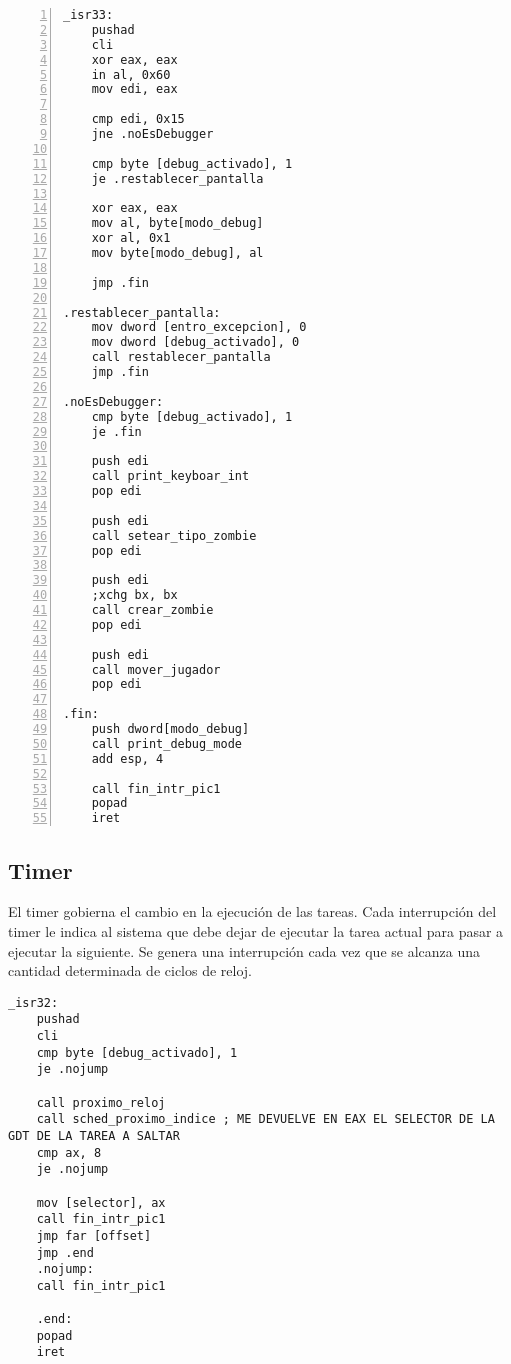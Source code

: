 \documentclass[a4paper]{article}
\begin{document}
\begin{lstlisting}[caption={Rutina de atención a la interrupción del teclado. -- \textbf{isr.asm}}, label=intTec, numbers=left, language={[x86masm]Assembler}]
_isr33:
    pushad
    cli 
    xor eax, eax
    in al, 0x60
    mov edi, eax

    cmp edi, 0x15
    jne .noEsDebugger

    cmp byte [debug_activado], 1
    je .restablecer_pantalla

    xor eax, eax
    mov al, byte[modo_debug]
    xor al, 0x1
    mov byte[modo_debug], al
    
    jmp .fin

.restablecer_pantalla:
    mov dword [entro_excepcion], 0
    mov dword [debug_activado], 0
    call restablecer_pantalla
    jmp .fin

.noEsDebugger:
	cmp byte [debug_activado], 1
	je .fin
	
    push edi
    call print_keyboar_int
    pop edi

    push edi
    call setear_tipo_zombie
    pop edi
    
    push edi
    ;xchg bx, bx
    call crear_zombie
    pop edi
    
    push edi
    call mover_jugador
    pop edi

.fin:
    push dword[modo_debug]
    call print_debug_mode
    add esp, 4

    call fin_intr_pic1
    popad
    iret
\end{lstlisting}


\subsection{Timer}
El timer gobierna el cambio en la ejecución de las tareas. Cada interrupción del timer le indica al sistema que debe dejar de ejecutar la tarea actual para pasar a ejecutar la siguiente. Se genera una interrupción cada vez que se alcanza una cantidad determinada de ciclos de reloj. 

\begin{lstlisting}[caption={Rutina de atención a la interrupción del timer. -- \textbf{isr.asm}}, label=intTim, language={[x86masm]Assembler}]
_isr32:
    pushad    
    cli
    cmp byte [debug_activado], 1
    je .nojump
    
    call proximo_reloj    
    call sched_proximo_indice ; ME DEVUELVE EN EAX EL SELECTOR DE LA GDT DE LA TAREA A SALTAR
    cmp ax, 8
    je .nojump

    mov [selector], ax
    call fin_intr_pic1
    jmp far [offset]
    jmp .end
    .nojump:
    call fin_intr_pic1
    
    .end:
    popad
    iret
\end{lstlisting}
\end{document}
